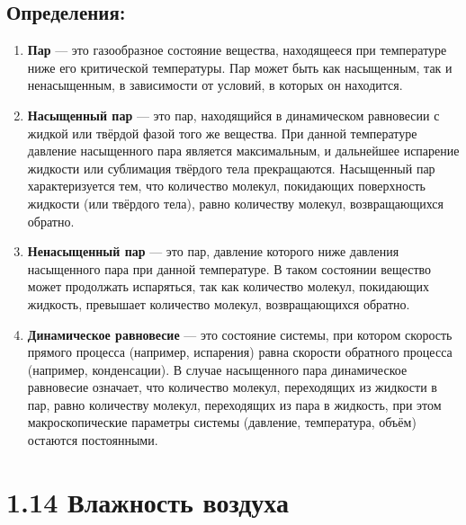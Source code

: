 \documentclass[a4paper,12pt]{article}
\begin{document}
\subsection*{Определения:}
\vspace{-3pt}
\begin{enumerate} [itemsep=0pt, topsep=0pt, parsep=0pt]
    \item \textbf{Пар} --- это газообразное состояние вещества, находящееся при температуре ниже его критической температуры. Пар может быть как насыщенным, так и ненасыщенным, в зависимости от условий, в которых он находится.
    \item \textbf{Насыщенный пар} — это пар, находящийся в динамическом равновесии с жидкой или твёрдой фазой того же вещества. При данной температуре давление насыщенного пара является максимальным, и дальнейшее испарение жидкости или сублимация твёрдого тела прекращаются. Насыщенный пар характеризуется тем, что количество молекул, покидающих поверхность жидкости (или твёрдого тела), равно количеству молекул, возвращающихся обратно.
    \item \textbf{Ненасыщенный пар} — это пар, давление которого ниже давления насыщенного пара при данной температуре. В таком состоянии вещество может продолжать испаряться, так как количество молекул, покидающих жидкость, превышает количество молекул, возвращающихся обратно.
    \item \textbf{Динамическое равновесие} — это состояние системы, при котором скорость прямого процесса (например, испарения) равна скорости обратного процесса (например, конденсации). В случае насыщенного пара динамическое равновесие означает, что количество молекул, переходящих из жидкости в пар, равно количеству молекул, переходящих из пара в жидкость, при этом макроскопические параметры системы (давление, температура, объём) остаются постоянными.
\end{enumerate}


\newpage
\section*{1.14 Влажность воздуха}
\vspace{-9pt}
\end{document}
